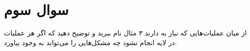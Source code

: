 \section{سوال سوم}

از میان عملیات‌هایی که نیاز به  دارند ۳ مثال نام ببرید و توضیح دهید که اگر هر عملیات در لایه  انجام نشود چه مشکل‌هایی را می‌تواند به وجود بیاورد.


\begin{qsolve}
	
\end{qsolve}
